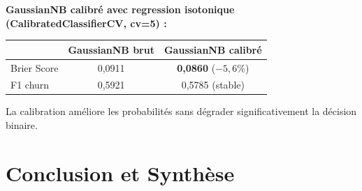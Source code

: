 \documentclass[12pt,a4paper]{article}
\begin{document}
\begin{resultbox}
\textbf{GaussianNB calibré avec regression isotonique (CalibratedClassifierCV, cv=5) :}
\begin{center}
\begin{tabular}{lcc}
\toprule
& \textbf{GaussianNB brut} & \textbf{GaussianNB calibré} \\
\midrule
Brier Score & 0{,}0911 & \textbf{0{,}0860} ($-5{,}6\%$) \\
F1 churn    & 0{,}5921 & 0{,}5785 (stable) \\
\bottomrule
\end{tabular}
\end{center}
La calibration améliore les probabilités sans dégrader significativement la décision binaire.
\end{resultbox}

\section{Conclusion et Synthèse}
\end{document}
